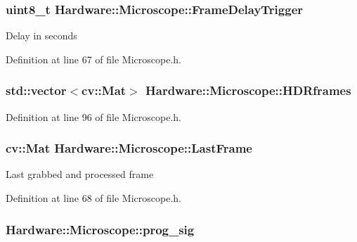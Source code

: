 \subsubsection[{Frame\+Delay\+Trigger}]{\setlength{\rightskip}{0pt plus 5cm}uint8\+\_\+t Hardware\+::\+Microscope\+::\+Frame\+Delay\+Trigger}\label{class_hardware_1_1_microscope_ac2da14781a22924a389fc287df3dbfda}
Delay in seconds 

Definition at line 67 of file Microscope.\+h.

\hypertarget{class_hardware_1_1_microscope_a2c73db8010320428db3fd41d840dd0eb}{}
\subsubsection[{H\+D\+Rframes}]{\setlength{\rightskip}{0pt plus 5cm}std\+::vector$<$cv\+::\+Mat$>$ Hardware\+::\+Microscope\+::\+H\+D\+Rframes\hspace{0.3cm}{\ttfamily [private]}}\label{class_hardware_1_1_microscope_a2c73db8010320428db3fd41d840dd0eb}


Definition at line 96 of file Microscope.\+h.

\hypertarget{class_hardware_1_1_microscope_afbbec8a14cd277cec7c3ee6ce0ba54a1}{}
\subsubsection[{Last\+Frame}]{\setlength{\rightskip}{0pt plus 5cm}cv\+::\+Mat Hardware\+::\+Microscope\+::\+Last\+Frame}\label{class_hardware_1_1_microscope_afbbec8a14cd277cec7c3ee6ce0ba54a1}
Last grabbed and processed frame 

Definition at line 68 of file Microscope.\+h.

\hypertarget{class_hardware_1_1_microscope_a819e11c0bfdb12b4c42b7ee2d330cb4d}{}
\subsubsection[{prog\+\_\+sig}]{ Hardware\+::\+Microscope\+::prog\+\_\+sig\hspace{0.3cm}{\ttfamily [private]}}\label{class_hardware_1_1_microscope_a819e11c0bfdb12b4c42b7ee2d330cb4d}


